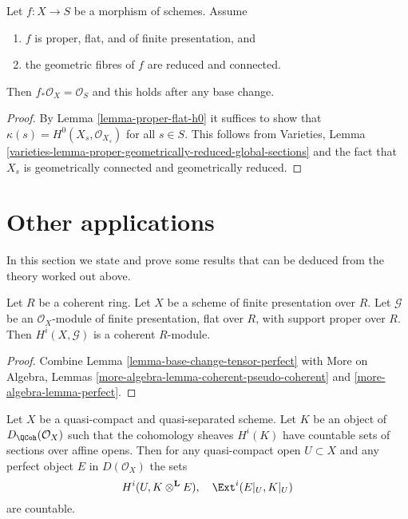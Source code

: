 \begin{lemma}
\label{lemma-proper-flat-geom-red-connected}
Let $f : X \to S$ be a morphism of schemes. Assume
\begin{enumerate}
\item $f$ is proper, flat, and of finite presentation, and
\item the geometric fibres of $f$ are reduced and connected.
\end{enumerate}
Then $f_*\mathcal{O}_X = \mathcal{O}_S$ and this holds
after any base change.
\end{lemma}

\begin{proof}
By Lemma \ref{lemma-proper-flat-h0}
it suffices to show that $\kappa(s) = H^0(X_s, \mathcal{O}_{X_s})$
for all $s \in S$. This follows from
Varieties, Lemma
\ref{varieties-lemma-proper-geometrically-reduced-global-sections}
and the fact that $X_s$ is geometrically connected and geometrically reduced.
\end{proof}







\section{Other applications}
\label{section-other-applications}

\noindent
In this section we state and prove some results that can be deduced
from the theory worked out above.

\begin{lemma}
\label{lemma-cohomology-over-coherent-ring}
Let $R$ be a coherent ring. Let $X$ be a scheme of finite presentation over $R$.
Let $\mathcal{G}$ be an $\mathcal{O}_X$-module of finite presentation,
flat over $R$, with support proper over $R$. Then
$H^i(X, \mathcal{G})$ is a coherent $R$-module.
\end{lemma}

\begin{proof}
Combine Lemma \ref{lemma-base-change-tensor-perfect} with
More on Algebra, Lemmas \ref{more-algebra-lemma-coherent-pseudo-coherent} and
\ref{more-algebra-lemma-perfect}.
\end{proof}

\begin{lemma}
\label{lemma-countable-cohomology}
Let $X$ be a quasi-compact and quasi-separated scheme.
Let $K$ be an object of $D_\QCoh(\mathcal{O}_X)$
such that the cohomology sheaves $H^i(K)$ have countable
sets of sections over affine opens. Then for any quasi-compact open
$U \subset X$ and any perfect object $E$ in $D(\mathcal{O}_X)$
the sets
$$
H^i(U, K \otimes^\mathbf{L} E),\quad \Ext^i(E|_U, K|_U)
$$
are countable.
\end{lemma}

